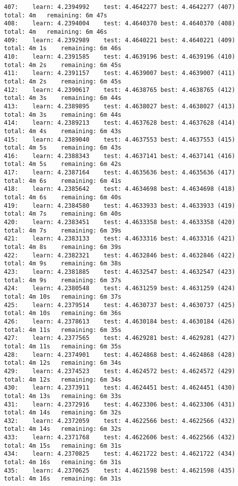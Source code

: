 \documentclass[11pt]{article}
\begin{document}
\begin{Verbatim}[commandchars=\\\{\}]
407:	learn: 4.2394992	test: 4.4642277	best: 4.4642277 (407)	total: 4m	remaining: 6m 47s
408:	learn: 4.2394004	test: 4.4640370	best: 4.4640370 (408)	total: 4m	remaining: 6m 46s
409:	learn: 4.2392989	test: 4.4640221	best: 4.4640221 (409)	total: 4m 1s	remaining: 6m 46s
410:	learn: 4.2391585	test: 4.4639196	best: 4.4639196 (410)	total: 4m 2s	remaining: 6m 45s
411:	learn: 4.2391157	test: 4.4639007	best: 4.4639007 (411)	total: 4m 2s	remaining: 6m 45s
412:	learn: 4.2390617	test: 4.4638765	best: 4.4638765 (412)	total: 4m 3s	remaining: 6m 44s
413:	learn: 4.2389895	test: 4.4638027	best: 4.4638027 (413)	total: 4m 3s	remaining: 6m 44s
414:	learn: 4.2389213	test: 4.4637628	best: 4.4637628 (414)	total: 4m 4s	remaining: 6m 43s
415:	learn: 4.2389040	test: 4.4637553	best: 4.4637553 (415)	total: 4m 5s	remaining: 6m 43s
416:	learn: 4.2388343	test: 4.4637141	best: 4.4637141 (416)	total: 4m 5s	remaining: 6m 42s
417:	learn: 4.2387164	test: 4.4635636	best: 4.4635636 (417)	total: 4m 6s	remaining: 6m 41s
418:	learn: 4.2385642	test: 4.4634698	best: 4.4634698 (418)	total: 4m 6s	remaining: 6m 40s
419:	learn: 4.2384580	test: 4.4633933	best: 4.4633933 (419)	total: 4m 7s	remaining: 6m 40s
420:	learn: 4.2383451	test: 4.4633358	best: 4.4633358 (420)	total: 4m 7s	remaining: 6m 39s
421:	learn: 4.2383133	test: 4.4633316	best: 4.4633316 (421)	total: 4m 8s	remaining: 6m 39s
422:	learn: 4.2382321	test: 4.4632846	best: 4.4632846 (422)	total: 4m 9s	remaining: 6m 38s
423:	learn: 4.2381885	test: 4.4632547	best: 4.4632547 (423)	total: 4m 9s	remaining: 6m 37s
424:	learn: 4.2380548	test: 4.4631259	best: 4.4631259 (424)	total: 4m 10s	remaining: 6m 37s
425:	learn: 4.2379514	test: 4.4630737	best: 4.4630737 (425)	total: 4m 10s	remaining: 6m 36s
426:	learn: 4.2378613	test: 4.4630184	best: 4.4630184 (426)	total: 4m 11s	remaining: 6m 35s
427:	learn: 4.2377565	test: 4.4629281	best: 4.4629281 (427)	total: 4m 11s	remaining: 6m 35s
428:	learn: 4.2374901	test: 4.4624868	best: 4.4624868 (428)	total: 4m 12s	remaining: 6m 34s
429:	learn: 4.2374523	test: 4.4624572	best: 4.4624572 (429)	total: 4m 12s	remaining: 6m 34s
430:	learn: 4.2373911	test: 4.4624451	best: 4.4624451 (430)	total: 4m 13s	remaining: 6m 33s
431:	learn: 4.2372916	test: 4.4623306	best: 4.4623306 (431)	total: 4m 14s	remaining: 6m 32s
432:	learn: 4.2372059	test: 4.4622566	best: 4.4622566 (432)	total: 4m 14s	remaining: 6m 32s
433:	learn: 4.2371768	test: 4.4622606	best: 4.4622566 (432)	total: 4m 15s	remaining: 6m 31s
434:	learn: 4.2370825	test: 4.4621722	best: 4.4621722 (434)	total: 4m 16s	remaining: 6m 31s
435:	learn: 4.2370625	test: 4.4621598	best: 4.4621598 (435)	total: 4m 16s	remaining: 6m 31s

\end{Verbatim}
\end{document}
